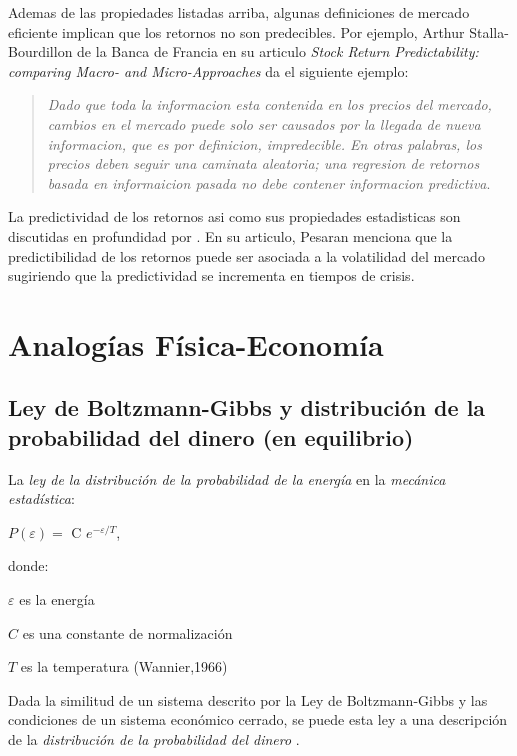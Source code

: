 Ademas de las propiedades listadas arriba, algunas definiciones de mercado eficiente implican que los retornos no son predecibles. Por ejemplo, Arthur Stalla-Bourdillon de la Banca de Francia en su articulo \textit{Stock Return Predictability: comparing Macro- and Micro-Approaches} \citep{stalla-bourdillon_stock_2022} da el siguiente ejemplo:
\begin{quotation}
\textit{Dado que toda la informacion esta contenida en los precios del mercado, cambios en el mercado puede solo ser causados por la llegada de nueva informacion, que es por definicion, impredecible. En otras palabras, los precios deben seguir una caminata aleatoria; una regresion de retornos basada en informaicion pasada no debe contener informacion predictiva}.
\end{quotation}
La predictividad de los retornos asi como sus propiedades estadisticas son discutidas en profundidad por \cite{Pesaran2010}.
En su articulo, Pesaran menciona que la predictibilidad de los retornos puede ser asociada a la volatilidad del mercado sugiriendo que la predictividad se incrementa en tiempos de crisis. 



\section{Analogías Física-Economía} 
\subsection{Ley de Boltzmann-Gibbs y distribución de la probabilidad del dinero (en equilibrio)} 

La \textit{ley de la distribución de la probabilidad de la energía} en la \textit{mecánica estadística}:

\begin{center}
$\mathit{P(\varepsilon)} = $ C $e^{-\varepsilon/\mathit{T}}$,
\end{center}
donde:

$\varepsilon$ es la energía

$C$ es una constante de normalización

$\mathit{T}$ es la temperatura (Wannier,1966) 

Dada la similitud de un sistema descrito por la Ley de Boltzmann-Gibbs y las condiciones de un sistema económico cerrado, se puede esta ley a una descripción de la \textit{distribución de la probabilidad del dinero}
\citep[][]{cottrell_classical_2009}.


